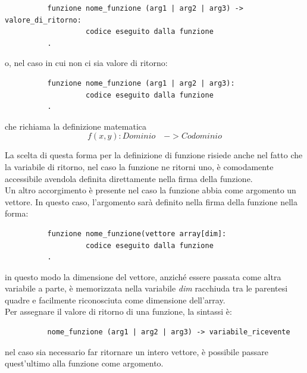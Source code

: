 \documentclass[11pt, a4paper, twoside, notitlepage]{report}
\begin{document}
\begin{verbatim}
          funzione nome_funzione (arg1 | arg2 | arg3) -> valore_di_ritorno:
                   codice eseguito dalla funzione
          .
\end{verbatim}

o, nel caso in cui non ci sia valore di ritorno:

\begin{verbatim}
          funzione nome_funzione (arg1 | arg2 | arg3):
                   codice eseguito dalla funzione
          .
\end{verbatim}


che richiama la definizione matematica
\[ f(x,y): Dominio \quad -> Codominio\]

La scelta di questa forma per la definizione di funzione risiede anche nel fatto
che la variabile di ritorno, nel caso la funzione ne ritorni uno, è comodamente
accessibile avendola definita direttamente nella firma della funzione.
\\Un altro accorgimento è presente nel caso la funzione abbia come argomento un
vettore. In questo caso, l'argomento sarà definito nella firma della funzione
nella forma:

\begin{verbatim}
          funzione nome_funzione(vettore array[dim]:
                   codice eseguito dalla funzione
          .
\end{verbatim}

in questo modo la dimensione del vettore, anziché essere passata come
altra variabile a parte, è memorizzata nella variabile \emph{dim} racchiuda tra
le parentesi quadre e facilmente riconosciuta come dimensione dell'array.
\\Per assegnare il valore di ritorno di una funzione, la sintassi è:
\begin{verbatim}
          nome_funzione (arg1 | arg2 | arg3) -> variabile_ricevente
\end{verbatim}
nel caso sia necessario far ritornare un intero vettore, è possibile passare
quest'ultimo alla funzione come argomento.
\end{document}
